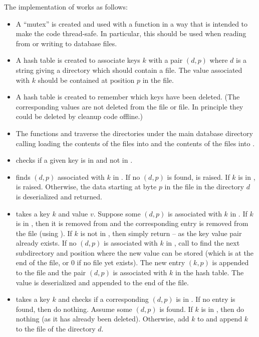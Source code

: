 The implementation of {} works as follows:
\begin{itemize}
\item A ``mutex'' {} is created and used with a function {}
in a way that is intended to make the code thread-safe. In particular,
this should be used when reading from or writing to database files.
\item A hash table {} is created to associate keys $k$ with a pair $(d,p)$
where $d$ is a string giving a directory which should contain a {} file.
The value associated with $k$ should be contained at position $p$ in the {} file.
\item A hash table {} is created to remember which keys have been deleted.
(The corresponding values are not deleted from the {} file or {} file.
In principle they could be deleted by cleanup code offline.)
\item The functions {} and {} traverse the directories under the
main database directory calling loading the contents of the {} files
into {} and the contents of the {} files into
{}.
\item {} checks if a given key is in {}
and not in {}.
\item {} finds $(d,p)$ associated with $k$ in {}.
If no $(d,p)$ is found, {} is raised.
If $k$ is in {}, {} is raised.
Otherwise, the data starting at byte $p$ in the {} file in the directory $d$
is deserialized and returned.
\item {} takes a key $k$ and value $v$.
Suppose some $(d,p)$ is associated with $k$ in {}.
If $k$ is in {}, then it is removed from {}
and the corresponding entry is removed from the {} file (using {}).
If $k$ is not in {}, then simply return -- as the
key value pair already exists.
If no $(d,p)$ is associated with $k$ in {},
call {} to find the next subdirectory
and position where the new value can be stored (which is at the end of the {} file,
or $0$ if no {} file yet exists).
The new entry $(k,p)$ is appended to the {} file
and the pair $(d,p)$ is associated with $k$ in the {} hash table.
The value is deserialized and appended to the end of the {} file.
\item {} takes a key $k$ and checks if a corresponding $(d,p)$ is in {}.
If no entry is found, then do nothing.
Assume some $(d,p)$ is found.
If $k$ is in {}, then do nothing (as it has already been deleted).
Otherwise, add $k$ to {}
and append $k$ to the {} file of the directory $d$.
\end{itemize}

